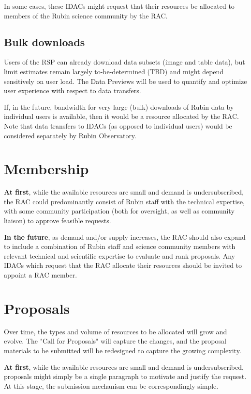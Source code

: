 In some cases, these IDACs might request that their resources be allocated to members of the Rubin science community by the RAC.


\subsection{Bulk downloads}\label{ssec:resources-downloads}

Users of the RSP can already download data subsets (image and table data), but limit estimates remain largely to-be-determined (TBD) and might depend sensitively on user load.
The Data Previews will be used to quantify and optimize user experience with respect to data transfers.

If, in the future, bandwidth for very large (bulk) downloads of Rubin data by individual users is available, then it would be a resource allocated by the RAC.
Note that data transfers to IDACs (as opposed to individual users) would be considered separately by Rubin Observatory.


\section{Membership}\label{sec:members}

\textbf{At first}, while the available resources are small and demand is undersubscribed, the RAC could predominantly consist of Rubin staff with the technical expertise, with some community participation (both for oversight, as well as community liaison) to approve feasible requests.

\textbf{In the future}, as demand and/or supply increases, the RAC should also expand to include a combination of Rubin staff and science community members with relevant technical and scientific expertise to evaluate and rank proposals.
Any IDACs which request that the RAC allocate their resources should be invited to appoint a RAC member.


\section{Proposals}\label{sec:proposals}

Over time, the types and volume of resources to be allocated will grow and evolve.
The "Call for Proposals" will capture the changes, and the proposal materials to be submitted will be redesigned to capture the growing complexity.

\textbf{At first}, while the available resources are small and demand is undersubscribed, proposals might simply be a single paragraph to motivate and justify the request.
At this stage, the submission mechanism can be correspondingly simple.

